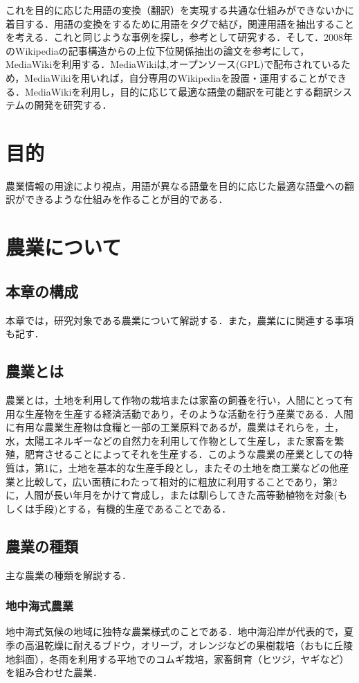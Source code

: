 これを目的に応じた用語の変換（翻訳）を実現する共通な仕組みができないかに着目する．用語の変換をするために用語をタグで結び，関連用語を抽出することを考える．これと同じような事例を探し，参考として研究する．そして．2008年のWikipediaの記事構造からの上位下位関係抽出の論文を参考にして，MediaWikiを利用する\cite{nogyo2015}．MediaWikiは,オープンソース(GPL)で配布されているため，MediaWikiを用いれば，自分専用のWikipediaを設置・運用することができる\cite{nico2015}．MediaWikiを利用し，目的に応じて最適な語彙の翻訳を可能とする翻訳システムの開発を研究する．


\chapter{目的}
農業情報の用途により視点，用語が異なる語彙を目的に応じた最適な語彙への翻訳ができるような仕組みを作ることが目的である．

\chapter{農業について}
\section{本章の構成}
本章では，研究対象である農業について解説する．また，農業にに関連する事項も記す．
\section{農業とは}
農業とは，土地を利用して作物の栽培または家畜の飼養を行い，人間にとって有用な生産物を生産する経済活動であり，そのような活動を行う産業である．人間に有用な農業生産物は食糧と一部の工業原料であるが，農業はそれらを，土，水，太陽エネルギーなどの自然力を利用して作物として生産し，また家畜を繁殖，肥育させることによってそれを生産する．このような農業の産業としての特質は，第1に，土地を基本的な生産手段とし，またその土地を商工業などの他産業と比較して，広い面積にわたって相対的に粗放に利用することであり，第2に，人間が長い年月をかけて育成し，または馴らしてきた高等動植物を対象(もしくは手段)とする，有機的生産であることである．\cite{nouwiki2015}
\section{農業の種類}
主な農業の種類を解説する．\cite{kotoba}
\subsection{地中海式農業}
地中海式気候の地域に独特な農業様式のことである．地中海沿岸が代表的で，夏季の高温乾燥に耐えるブドウ，オリーブ，オレンジなどの果樹栽培（おもに丘陵地斜面），冬雨を利用する平地でのコムギ栽培，家畜飼育（ヒツジ，ヤギなど）を組み合わせた農業．

